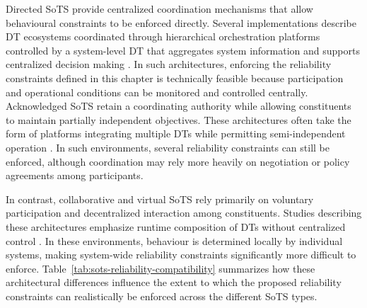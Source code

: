 Directed SoTS provide centralized coordination mechanisms that allow behavioural constraints to be enforced directly. Several implementations describe DT ecosystems coordinated through hierarchical orchestration platforms controlled by a system-level DT that aggregates system information and supports centralized decision making \cite{novak2022digitalized,parri2021framework,reiche2021digital,dickopf2019holistic}. In such architectures, enforcing the reliability constraints defined in this chapter is technically feasible because participation and operational conditions can be monitored and controlled centrally. Acknowledged SoTS retain a coordinating authority while allowing constituents to maintain partially independent objectives. These architectures often take the form of platforms integrating multiple DTs while permitting semi-independent operation \cite{parri2019jarvis,maheshwari2022digital,bellavista2023requirements,binder2021utilizing}. In such environments, several reliability constraints can still be enforced, although coordination may rely more heavily on negotiation or policy agreements among participants.

In contrast, collaborative and virtual SoTS rely primarily on voluntary participation and decentralized interaction among constituents. Studies describing these architectures emphasize runtime composition of DTs without centralized control \cite{acharya2023twins,gil2023modeling,esterle2021digital}. In these environments, behaviour is determined locally by individual systems, making system-wide reliability constraints significantly more difficult to enforce. Table~\ref{tab:sots-reliability-compatibility} summarizes how these architectural differences influence the extent to which the proposed reliability constraints can realistically be enforced across the different SoTS types.
